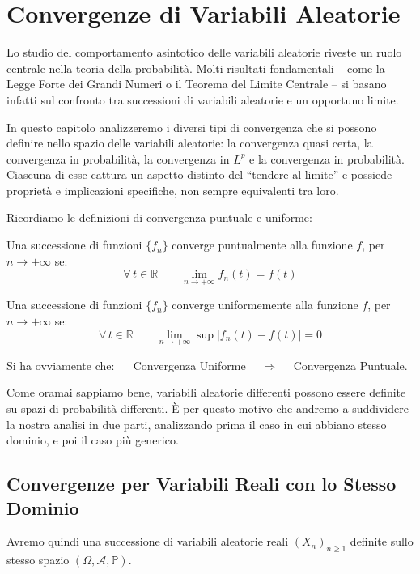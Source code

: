 \chapter{Convergenze di Variabili Aleatorie}

Lo studio del comportamento asintotico delle variabili aleatorie riveste un ruolo
centrale nella teoria della probabilità. Molti risultati fondamentali – come la Legge
Forte dei Grandi Numeri o il Teorema del Limite Centrale – si basano infatti sul
confronto tra successioni di variabili aleatorie e un opportuno limite.

\medskip
In questo capitolo  analizzeremo i diversi tipi di convergenza che
si possono definire nello spazio delle variabili aleatorie: la convergenza quasi
certa, la convergenza in probabilità, la convergenza in $L^{p}$ e la convergenza in probabilità. Ciascuna di esse cattura un aspetto distinto del ``tendere al limite'' e possiede proprietà e implicazioni specifiche, non sempre equivalenti tra loro.


\bigskip
\noindent Ricordiamo le definizioni di convergenza puntuale e uniforme:

\begin{definizione}
    Una successione di funzioni $\{f_n\}$ converge puntualmente alla funzione $f$, per $n\to+\infty$ se:
    \[\forall \,t\in\mathbb R\qquad \lim_{n\to+\infty}f_n(t) = f(t)\]
\end{definizione}

\begin{definizione}
    Una successione di funzioni $\{f_n\}$ converge uniformemente alla funzione $f$, per $n\to+\infty$ se:
    \[\forall \,t\in\mathbb R\qquad \lim_{n\to+\infty}\sup |f_n(t) - f(t)| = 0\]
\end{definizione}

\noindent Si ha ovviamente che: $\quad$ Convergenza Uniforme $\quad \Rightarrow \quad$ Convergenza Puntuale.

\bigskip
\noindent Come oramai sappiamo bene, variabili aleatorie differenti possono essere definite su spazi di probabilità differenti. È per questo motivo che andremo a suddividere la nostra analisi in due parti, analizzando prima il caso in cui abbiano stesso dominio, e poi il caso più generico.

\section{Convergenze per Variabili Reali con lo Stesso Dominio}
Avremo quindi una successione di variabili aleatorie reali $(X_n)_{n\geq1}$ definite sullo stesso spazio $(\Omega, \mathcal{A}, \mathbb{P})$.

